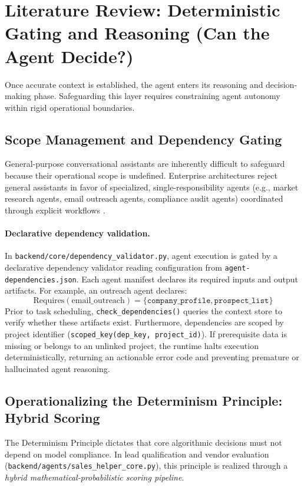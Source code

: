 \documentclass[10pt,a4paper,twocolumn]{article}
\begin{document}
\section{Literature Review: Deterministic Gating and Reasoning (Can the Agent Decide?)}
\label{sec:decide}

Once accurate context is established, the agent enters its reasoning and decision-making phase. Safeguarding this layer requires constraining agent autonomy within rigid operational boundaries.

\subsection{Scope Management and Dependency Gating}
General-purpose conversational assistants are inherently difficult to safeguard because their operational scope is undefined. Enterprise architectures reject general assistants in favor of specialized, single-responsibility agents (e.g., market research agents, email outreach agents, compliance audit agents) coordinated through explicit workflows \cite{anthropic2024effective}.

\paragraph{Declarative dependency validation.} In \texttt{backend/core/dependency_validator.py}, agent execution is gated by a declarative dependency validator reading configuration from \texttt{agent-dependencies.json}. Each agent manifest declares its required inputs and output artifacts. For example, an outreach agent declares:
\begin{equation}
\text{Requires}(\text{email\_outreach}) = \{ \texttt{company\_profile}, \texttt{prospect\_list} \}
\end{equation}
Prior to task scheduling, \texttt{check\_dependencies()} queries the context store to verify whether these artifacts exist. Furthermore, dependencies are scoped by project identifier (\texttt{scoped\_key(dep\_key, project\_id)}). If prerequisite data is missing or belongs to an unlinked project, the runtime halts execution deterministically, returning an actionable error code and preventing premature or hallucinated agent reasoning.

\subsection{Operationalizing the Determinism Principle: Hybrid Scoring}
The Determinism Principle dictates that core algorithmic decisions must not depend on model compliance. In lead qualification and vendor evaluation (\texttt{backend/agents/sales_helper_core.py}), this principle is realized through a \emph{hybrid mathematical-probabilistic scoring pipeline}.
\end{document}
